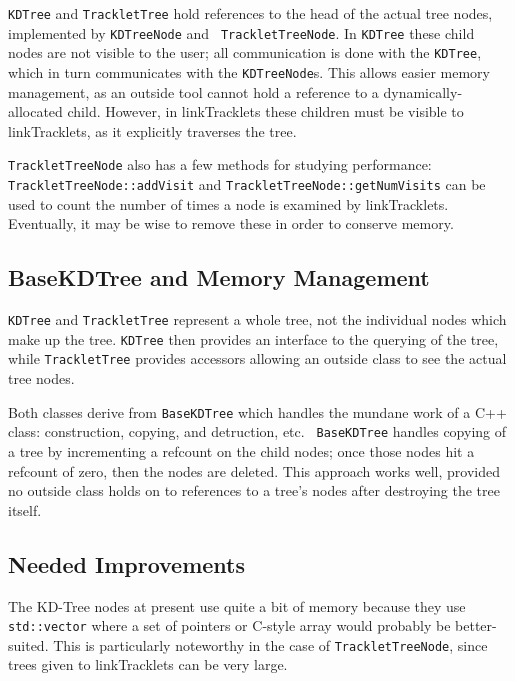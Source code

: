 {\tt KDTree} and {\tt TrackletTree} hold references to the head of the
actual tree nodes, implemented by {\tt KDTreeNode} and {\tt
TrackletTreeNode}.  In {\tt KDTree} these child nodes are not visible
to the user; all communication is done with the {\tt KDTree}, which in
turn communicates with the {\tt KDTreeNode}s.  This allows easier
memory management, as an outside tool cannot hold a reference to a
dynamically-allocated child.  However, in linkTracklets these children
must be visible to linkTracklets, as it explicitly traverses the tree.  

{\tt TrackletTreeNode} also has a few methods for studying performance:
{\tt TrackletTreeNode::addVisit} and {\tt TrackletTreeNode::getNumVisits} can
be used to count the number of times a node is examined by
linkTracklets.  Eventually, it may be wise to remove these in order to
conserve memory.


\subsection{BaseKDTree and Memory Management}

{\tt KDTree} and {\tt TrackletTree} represent a whole tree, not the
individual nodes which make up the tree.  {\tt KDTree} then provides
an interface to the querying of the tree, while {\tt TrackletTree}
provides accessors allowing an outside class to see the actual tree
nodes.  

Both classes derive from {\tt BaseKDTree} which handles the mundane
work of a C++ class: construction, copying, and detruction, etc. {\tt
BaseKDTree} handles copying of a tree by incrementing a refcount on
the child nodes; once those nodes hit a refcount of zero, then the
nodes are deleted.  This approach works well, provided no outside
class holds on to references to a tree's nodes after destroying the
tree itself.




\subsection{Needed Improvements}
The KD-Tree nodes at present use quite a bit of memory because they
use {\tt std::vector} where a set of pointers or C-style array would
probably be better-suited.  This is particularly noteworthy in the
case of {\tt TrackletTreeNode}, since trees given to linkTracklets can
be very large.



